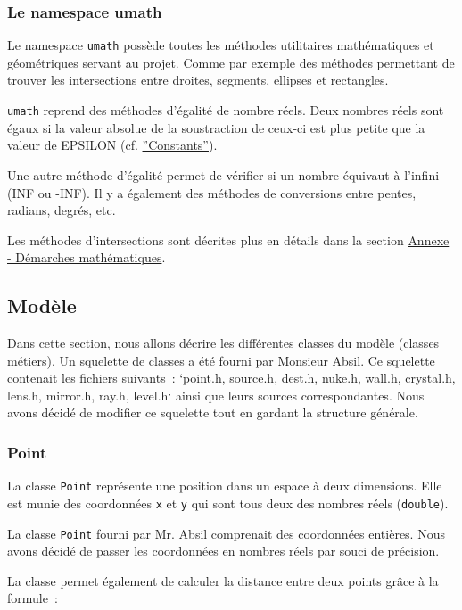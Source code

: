\documentclass[]{article}
\begin{document}
\subsubsection{Le namespace umath}

Le namespace \texttt{umath} possède toutes les méthodes utilitaires mathématiques
et géométriques servant au projet. Comme par exemple des méthodes permettant de trouver
les intersections entre droites, segments, ellipses et rectangles.

\label{equals}
\texttt{umath} reprend des méthodes d'égalité de nombre réels. Deux nombres réels sont égaux
si la valeur absolue de la soustraction de ceux-ci est plus petite que la valeur de EPSILON (cf. \hyperref[Constants]{''Constants''}).

Une autre méthode d’égalité permet de vérifier si un nombre équivaut à l’infini (INF ou -INF).
Il y a également des méthodes de conversions entre pentes, radians, degrés, etc.

Les méthodes d’intersections sont décrites plus en détails dans la section \hyperref[Annexe]{Annexe - Démarches mathématiques}.

\subsection{Modèle}

Dans cette section, nous allons décrire les différentes classes du modèle 
(classes métiers).
Un squelette de classes a été fourni par Monsieur Absil.
Ce squelette contenait les fichiers suivants~:
`point.h, source.h, dest.h, nuke.h, wall.h,
crystal.h, lens.h, mirror.h, ray.h, level.h` ainsi que leurs sources correspondantes.
Nous avons décidé de modifier ce squelette tout en gardant la 
structure générale.

\subsubsection{\label{Point}Point}

La classe \texttt{Point} représente une position dans un espace à deux dimensions. 
Elle est munie des coordonnées \texttt{x} et \texttt{y} qui sont tous deux des
nombres réels (\texttt{double}). 

La classe \texttt{Point} fourni par Mr. Absil comprenait des coordonnées entières.
Nous avons décidé de passer les coordonnées en nombres réels par souci de précision.

La classe permet également de calculer la distance entre deux points grâce à la formule~:
\end{document}
